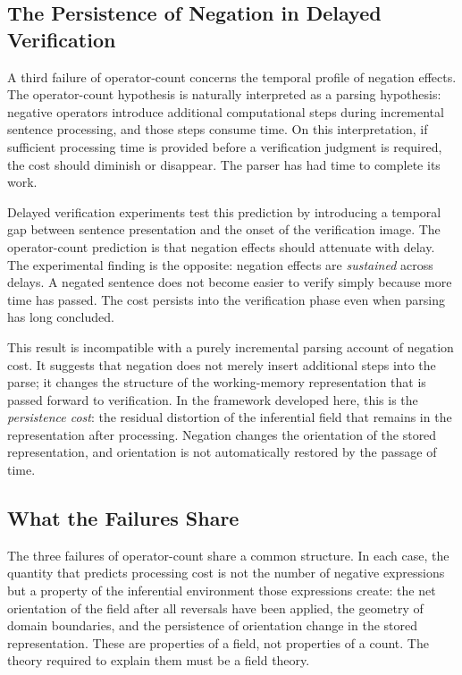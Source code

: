 \documentclass[12pt]{article}
\theoremstyle{remark}
\begin{document}
\subsection{The Persistence of Negation in Delayed Verification}

A third failure of operator-count concerns the temporal profile of
negation effects. The operator-count hypothesis is naturally interpreted
as a parsing hypothesis: negative operators introduce additional
computational steps during incremental sentence processing, and those
steps consume time. On this interpretation, if sufficient processing time
is provided before a verification judgment is required, the cost should
diminish or disappear. The parser has had time to complete its work.

Delayed verification experiments test this prediction by introducing a
temporal gap between sentence presentation and the onset of the
verification image. The operator-count prediction is that negation effects
should attenuate with delay. The experimental finding is the opposite:
negation effects are \emph{sustained} across delays. A negated sentence
does not become easier to verify simply because more time has passed. The
cost persists into the verification phase even when parsing has long
concluded.

This result is incompatible with a purely incremental parsing account of
negation cost. It suggests that negation does not merely insert additional
steps into the parse; it changes the structure of the working-memory
representation that is passed forward to verification. In the framework
developed here, this is the \emph{persistence cost}: the residual
distortion of the inferential field that remains in the representation
after processing. Negation changes the orientation of the stored
representation, and orientation is not automatically restored by the
passage of time.

\subsection{What the Failures Share}

The three failures of operator-count share a common structure. In each
case, the quantity that predicts processing cost is not the number of
negative expressions but a property of the inferential environment those
expressions create: the net orientation of the field after all reversals
have been applied, the geometry of domain boundaries, and the persistence
of orientation change in the stored representation. These are properties
of a field, not properties of a count. The theory required to explain
them must be a field theory.
\end{document}
